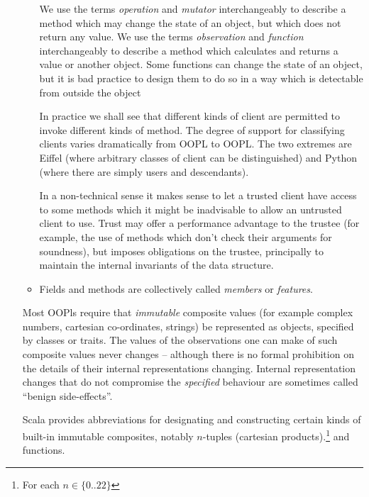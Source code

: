 \documentclass{ip3}
\begin{document}
\begin{foil}
\begin{itemize}
\begin{itemize}
\begin{itemize}
           \end{itemize}
           \begin{note}
               We use the terms \textit{operation} and  \textit{mutator} interchangeably to
               describe a method which may change the state of an object, but which
               does not return any value. We use the terms \textit{observation}
               and \textit{function} interchangeably to describe a method which
               calculates and returns a value or another object. Some functions
               can change the state of an object, but it is bad practice to design
               them to do so in a way which is detectable from outside the object
           \par    
               In practice we shall see that different kinds of client are permitted to invoke
               different kinds of method. The degree of support for classifying
               clients varies dramatically from OOPL to OOPL. The two
               extremes are Eiffel (where arbitrary classes of client can be
               distinguished) and Python (where there are simply users and descendants).
          \par     
               In a non-technical sense it makes sense to let a trusted client have access to 
               some methods which it might be inadvisable to allow an untrusted client to
               use. Trust may offer a performance advantage to the trustee (for example, the use
               of methods which don't check their arguments for soundness), but
               imposes obligations on the trustee, principally to maintain the internal
               invariants of the data structure.
           \end{note}
           
           \item  Fields and methods are collectively called  
                  \textit{members} or \textit{features}.
      \end{itemize}
      \begin{note}
          Most OOPls require that \textit{immutable} composite values
          (for example complex numbers, cartesian co-ordinates, strings)
          be represented as objects, specified by classes or traits. The
          values of the observations one can make of such composite values
          never changes -- although there is no formal prohibition on the details
          of their internal representations changing.  Internal representation
          changes that do not compromise the \textit{specified} behaviour
          are sometimes called ``benign side-effects''.
          \par
          Scala provides abbreviations for designating and constructing certain kinds of built-in 
          immutable composites, notably $n$-tuples (cartesian products).\footnote{For each $n\in\{0..22\}$}
          and functions.
      \end{note}

\end{itemize}
\end{foil}
\end{document}
